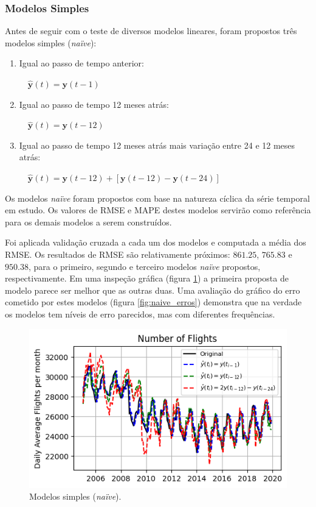 \documentclass[final,5p]{elsarticle}
\numberwithin{equation}{section}
\begin{document}
    \subsubsection{Modelos Simples} \label{sec:modelos_naive}

    Antes de seguir com o teste de diversos modelos lineares, foram propostos três modelos simples (\emph{naïve}):
    \begin{enumerate}
        \item Igual ao passo de tempo anterior:

        $\quad \hat{\textbf{y}}(t) = \textbf{y}(t-1)$

        \item Igual ao passo de tempo 12 meses atrás:

        $\quad \hat{\textbf{y}}(t) = \textbf{y}(t-12)$

        \item Igual ao passo de tempo 12 meses atrás mais variação entre 24 e 12 meses atrás:

        $\quad \hat{\textbf{y}}(t) = \textbf{y}(t-12) + [\textbf{y}(t-12) - \textbf{y}(t-24)]$
    \end{enumerate}

    Os modelos \emph{naïve} foram propostos com base na natureza cíclica da série temporal em estudo. Os valores de RMSE e MAPE destes modelos servirão como referência para os demais modelos a serem construídos.

    Foi aplicada validação cruzada a cada um dos modelos e computada a média dos RMSE. Os resultados de RMSE são relativamente próximos: $861.25$, $765.83$ e $950.38$, para o primeiro, segundo e terceiro modelos \emph{naïve} propostos, respectivamente. Em uma inspeção gráfica (figura \ref{fig:naive}) a primeira proposta de modelo parece ser melhor que as outras duas. Uma avaliação do gráfico do erro cometido por estes modelos (figura \ref{fig:naive_erros}) demonstra que na verdade os modelos tem níveis de erro parecidos, mas com diferentes frequências.

        \begin{figure}[hbt!]
            \includegraphics[width=0.95\columnwidth]{B1_Naive.png}
            \caption{Modelos simples (\emph{naïve}).}
            \label{fig:naive}
        \end{figure}
\end{document}
